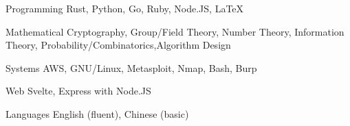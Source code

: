 


\begin{cvskills}


\cvskill
{Programming} %
{Rust, Python, Go, Ruby, Node.JS, LaTeX} %


\cvskill
{Mathematical} %
{Cryptography, Group/Field Theory, Number Theory, Information Theory, Probability/Combinatorics,\newline Algorithm Design} %


\cvskill
{Systems} %
{AWS, GNU/Linux, Metasploit, Nmap, Bash, Burp} %


\cvskill
{Web} %
{Svelte, Express with Node.JS} %


\cvskill
{Languages} %
{English (fluent), Chinese (basic)} %


\end{cvskills}